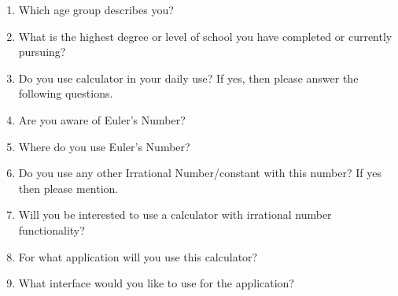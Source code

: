 \documentclass[12pt]{report}
\begin{document}
\vspace{\baselineskip}
\begin{enumerate}
	\item Which age group describes you? \par

	\item What is the highest degree or level of school you have completed or currently pursuing?\par

	\item Do you use calculator in your daily use? If yes, then please answer the following questions.\par

	\item Are you aware of Euler's Number?\par

	\item Where do you use Euler's Number?\par

	\item Do you use any other Irrational Number/constant with this number? If yes then please mention.\par

	\item Will you be interested to use a calculator with irrational number functionality?\par

	\item For what application will you use this calculator?\par

	\item What interface would you like to use for the application?
\end{enumerate}\par


\vspace{\baselineskip}

\vspace{\baselineskip}

\vspace{\baselineskip}

\vspace{\baselineskip}

\vspace{\baselineskip}

\vspace{\baselineskip}

\vspace{\baselineskip}
\end{document}
